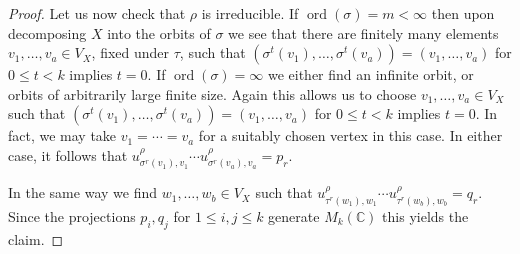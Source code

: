\documentclass[10pt,a4paper]{amsart}
\DeclareMathOperator{\ord}{ord}
\begin{document}
\begin{proof}
Let us now check that $ \rho $ is irreducible. If $ \ord(\sigma) = m < \infty $ then 
upon decomposing $ X $ into the orbits of $ \sigma $ we see that there are finitely many elements $ v_1, \dots, v_a \in V_X $, fixed under $ \tau $, 
such that $ (\sigma^t(v_1), \dots, \sigma^t(v_a)) = (v_1, \dots, v_a) $ for $ 0 \leq t < k $ implies $ t = 0 $. 
If $ \ord(\sigma) = \infty $ we either find an infinite orbit, or orbits of arbitrarily large finite size. 
Again this allows us to choose $ v_1, \dots, v_a \in V_X $ such that $ (\sigma^t(v_1), \dots, \sigma^t(v_a)) = (v_1, \dots, v_a) $ for $ 0 \leq t < k $ implies $ t = 0 $.
In fact, we may take $ v_1 = \cdots = v_a $ for a suitably chosen vertex in this case. 
In either case, it follows that $ u^\rho_{\sigma^r(v_1), v_1} \cdots u^\rho_{\sigma^r(v_a), v_a} = p_r $. 

In the same way we find $ w_1, \dots, w_b \in V_X $ such that $ u^\rho_{\tau^r(w_1), w_1} \cdots u^\rho_{\tau^r(w_b), w_b} = q_r $. 
Since the projections $ p_i, q_j $ for $ 1 \leq i,j \leq k $ generate $ M_k(\mathbb{C}) $ this yields the claim.
\end{proof} 
\end{document}
